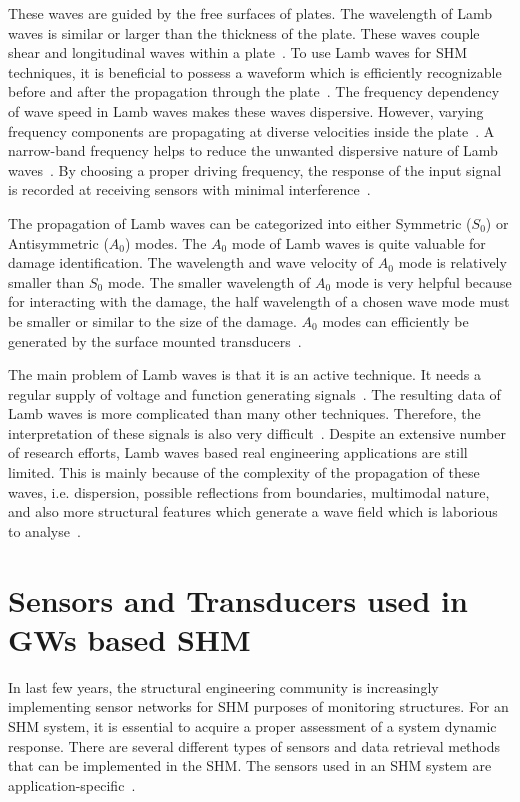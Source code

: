 \documentclass[b5paper, 11pt, titlepage]{book}
\begin{document}
These waves are guided by the free surfaces of plates. The wavelength of Lamb waves is similar or larger than the thickness of the plate. These waves couple shear and longitudinal waves within a plate~\cite{Farrar2012}. To use Lamb waves for SHM techniques, it is beneficial to possess a waveform which is efficiently recognizable before and after the propagation through the plate~\cite{Farrar2012}. The frequency dependency of wave speed in Lamb waves makes these waves dispersive. However, varying frequency components are propagating at diverse velocities inside the plate~\cite{Farrar2012}. A narrow-band frequency helps to reduce the unwanted dispersive nature of Lamb waves~\cite{Kessler2002}. By choosing a proper driving frequency, the response of the input signal is recorded at receiving sensors with minimal interference~\cite{Farrar2012}. 

The propagation of Lamb waves can be categorized into either Symmetric ($S_0$) or Antisymmetric ($A_0$) modes. The $A_0$ mode of Lamb waves is quite valuable for damage identification. The wavelength and wave velocity of $A_0$ mode is relatively smaller than $S_0$ mode. The smaller wavelength of $A_0$ mode is very helpful because for interacting with the damage, the half wavelength of a chosen wave mode must be smaller or similar to the size of the damage. $A_0$ modes can efficiently be generated by the surface mounted transducers~\cite{Ricci2016}.  

The main problem of Lamb waves is that it is an active technique. It needs a regular supply of voltage and function generating signals~\cite{MMaia, Kessler2002}. The resulting data of Lamb waves is more complicated than many other techniques. Therefore, the interpretation of these signals is also very difficult~\cite{Kessler2002}. Despite an extensive number of research efforts, Lamb waves based real engineering applications are still limited. This is mainly because of the complexity of the propagation of these waves, i.e. dispersion, possible reflections from boundaries, multimodal nature, and also more structural features which generate a wave field which is laborious to analyse~\cite{stepinski2013advanced}.

\section{Sensors and Transducers used in GWs based SHM}
In last few years, the structural engineering community is increasingly implementing sensor networks for SHM purposes of monitoring structures. For an SHM system, it is essential to acquire a proper assessment of a system dynamic response. There are several different types of sensors and data retrieval methods that can be implemented in the SHM. The sensors used in an SHM system are application-specific~\cite{Farrar2012}.
\end{document}
